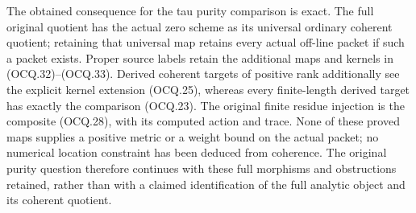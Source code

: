 The obtained consequence for the tau purity comparison is exact.
The full original quotient has the actual zero scheme as its universal
ordinary coherent quotient; retaining that universal map retains every
actual off-line packet if such a packet exists.  Proper source labels
retain the additional maps and kernels in (OCQ.32)--(OCQ.33).
Derived coherent targets of positive rank additionally see the explicit
kernel extension (OCQ.25), whereas every finite-length derived target
has exactly the comparison (OCQ.23).  The original finite residue
injection is the composite (OCQ.28), with its computed action and trace.
None of these proved maps supplies a positive metric or a weight bound
on the actual packet; no numerical location constraint has been deduced
from coherence.  The original purity question therefore continues with
these full morphisms and obstructions retained, rather than with a
claimed identification of the full analytic object and its coherent
quotient.
